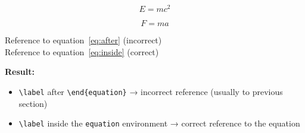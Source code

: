 \documentclass{article}
\begin{document}
\begin{equation}
E = mc^2
\end{equation}
\label{eq:after}  %

\begin{equation}
F = ma
\label{eq:inside}  %
\end{equation}

Reference to equation~\ref{eq:after} (incorrect)\\
Reference to equation~\ref{eq:inside} (correct)

\textbf{Result:}
\begin{itemize}
\item \texttt{\textbackslash label} after \texttt{\textbackslash end\{equation\}} → incorrect reference (usually to previous section)
\item \texttt{\textbackslash label} inside the \texttt{equation} environment → correct reference to the equation
\end{itemize}
\end{document}
